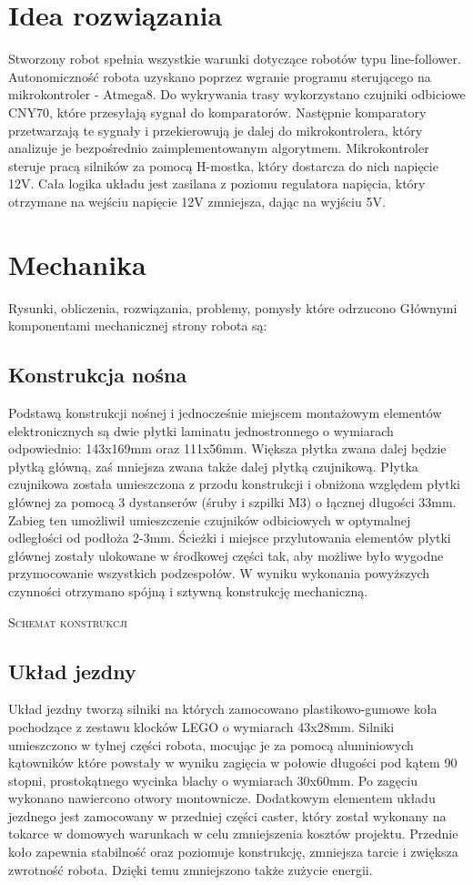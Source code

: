 \documentclass[11pt,a4paper]{article}
\begin{document}
\section{Idea rozwiązania}
Stworzony robot spełnia wszystkie warunki dotyczące robotów typu line-follower.
Autonomiczność robota uzyskano poprzez wgranie programu sterującego na mikrokontroler - Atmega8. 
Do wykrywania trasy wykorzystano czujniki odbiciowe CNY70, które przesyłają sygnał do komparatorów.
Następnie komparatory przetwarzają te sygnały i przekierowują je dalej do mikrokontrolera, który analizuje je bezpośrednio zaimplementowanym algorytmem. 
Mikrokontroler steruje pracą silników za pomocą H-mostka, który dostarcza do nich napięcie 12V.
Cała logika układu jest zasilana z poziomu regulatora napięcia, który otrzymane na wejściu napięcie 12V zmniejsza, dając na wyjściu 5V. 

\section{Mechanika}
Rysunki, obliczenia, rozwiązania, problemy, pomysły które odrzucono
  Głównymi komponentami mechanicznej strony robota są:
  \subsection{Konstrukcja nośna}
  Podstawą konstrukcji nośnej i jednocześnie miejscem montażowym elementów elektronicznych są dwie płytki laminatu jednostronnego o wymiarach odpowiednio: 143x169mm oraz 111x56mm. Większa płytka zwana dalej będzie płytką główną, zaś mniejsza zwana także dalej płytką czujnikową. Płytka czujnikowa została umieszczona z przodu konstrukcji i obniżona względem płytki głównej za pomocą 3 dystanserów (śruby i szpilki M3) o łącznej długości 33mm. Zabieg ten umożliwił umieszczenie czujników odbiciowych w optymalnej odległości od podłoża 2-3mm.
  Ścieżki i miejsce przylutowania elementów płytki głównej zostały ulokowane w środkowej części tak, aby możliwe było wygodne przymocowanie wszystkich podzespołów. 
  W wyniku wykonania powyższych czynności otrzymano spójną i sztywną konstrukcję mechaniczną.
  
  \textsc{Schemat konstrukcji}
  
  \subsection{Układ jezdny}
  Układ jezdny tworzą silniki na których zamocowano plastikowo-gumowe koła pochodzące z zestawu klocków LEGO o wymiarach 43x28mm.
  Silniki umieszczono w tylnej części robota, mocując je za pomocą aluminiowych kątowników które powstały w wyniku zagięcia w połowie długości pod kątem 90 stopni, prostokątnego wycinka blachy o wymiarach 30x60mm. Po zagęciu wykonano nawiercono otwory montownicze.
  Dodatkowym elementem układu jezdnego jest zamocowany w przedniej części caster, który został wykonany na tokarce w domowych warunkach w celu zmniejszenia kosztów projektu. Przednie koło zapewnia stabilność oraz poziomuje konstrukcję, zmniejsza tarcie i zwiększa zwrotność robota. Dzięki temu zmniejszono także zużycie energii.
  
\end{document}
